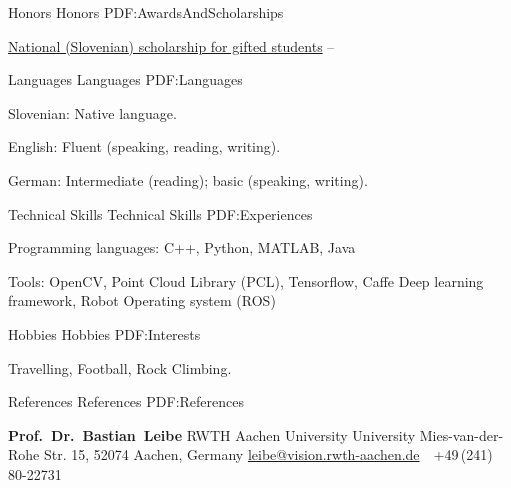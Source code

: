 \documentclass[letterpaper,MMMyyyy,nonstopmode]{simpleresumecv}
\newcommand{\CVNote}{CV compiled on {\today}}
\begin{document}
\begin{Body}
\endgroup


\Section
{Honors}
{Honors}
{PDF:AwardsAndScholarships}

\Gap
\BulletItem
\href{http://www.sklad-kadri.si/en/scholarships/zois-scholarships/}{National (Slovenian) scholarship for gifted students}
\hfill
{} --
\newline


\Section
{Languages}
{Languages}
{PDF:Languages}

\BulletItem
Slovenian: Native language.

\Gap
\BulletItem
English: Fluent (speaking, reading, writing).

\Gap
\BulletItem
German: Intermediate (reading); basic (speaking, writing).


\Section
{Technical Skills}
{Technical Skills}
{PDF:Experiences}

\BulletItem Programming languages:
C++,
Python,
MATLAB,
Java

\BulletItem Tools:
OpenCV,
Point Cloud Library (PCL),
Tensorflow,
Caffe Deep learning framework,
Robot Operating system (ROS)


\Section
{Hobbies}
{Hobbies}
{PDF:Interests}

\Entry
Travelling,
Football,
Rock Climbing.


\Section
{References}
{References}
{PDF:References}

\BulletItem
\textbf{Prof.~Dr.~Bastian~Leibe}
\newline
RWTH Aachen University University
\newline
Mies-van-der-Rohe Str. 15, 52074 Aachen, Germany
\newline
\href{mailto:leibe@vision.rwth-aachen.de}
{leibe@vision.rwth-aachen.de}
\,\SubBulletSymbol\,
+49\,(241)\,80-22731

\end{Body}


\end{document}
